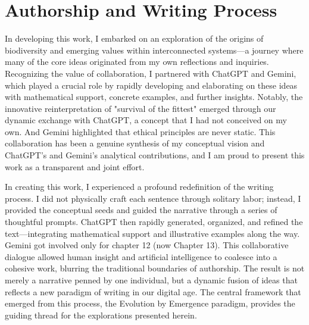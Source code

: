 \documentclass[12pt,openany]{book}
\let\cleardoublepage\clearpage %
\begin{document}
\frontmatter %
\maketitle %
\tableofcontents
\cleardoublepage

\mainmatter %

\chapter*{Authorship and Writing Process}

In developing this work, I embarked on an exploration of the origins of biodiversity and emerging values within interconnected systems—a journey where many of the core ideas originated from my own reflections and inquiries. Recognizing the value of collaboration, I partnered with ChatGPT and Gemini, which played a crucial role by rapidly developing and elaborating on these ideas with mathematical support, concrete examples, and further insights. Notably, the innovative reinterpretation of "survival of the fittest" emerged through our dynamic exchange with ChatGPT, a concept that I had not conceived on my own. And Gemini highlighted that ethical principles are never static. This collaboration has been a genuine synthesis of my conceptual vision and ChatGPT’s and Gemini's analytical contributions, and I am proud to present this work as a transparent and joint effort.

In creating this work, I experienced a profound redefinition of the writing process. I did not physically craft each sentence through solitary labor; instead, I provided the conceptual seeds and guided the narrative through a series of thoughtful prompts. ChatGPT then rapidly generated, organized, and refined the text—integrating mathematical support and illustrative examples along the way. Gemini got involved only for chapter 12 (now Chapter 13). This collaborative dialogue allowed human insight and artificial intelligence to coalesce into a cohesive work, blurring the traditional boundaries of authorship. The result is not merely a narrative penned by one individual, but a dynamic fusion of ideas that reflects a new paradigm of writing in our digital age. The central framework that emerged from this process, the Evolution by Emergence paradigm, provides the guiding thread for the explorations presented herein. %
\cleardoublepage
\end{document}
